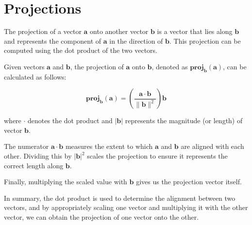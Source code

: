 \chapter{Projections}

The projection of a vector $\mathbf{a}$ onto another vector
$\mathbf{b}$ is a vector that lies along $\mathbf{b}$ and represents
the component of $\mathbf{a}$ in the direction of $\mathbf{b}$. This
projection can be computed using the dot product of the two vectors.

Given vectors $\mathbf{a}$ and $\mathbf{b}$, the projection of
$\mathbf{a}$ onto $\mathbf{b}$, denoted as
$\mathbf{proj}_\mathbf{b}(\mathbf{a})$, can be calculated as follows:

$$\mathbf{proj}_\mathbf{b}(\mathbf{a}) = \left(\frac{{\mathbf{a} \cdot \mathbf{b}}}{{\|\mathbf{b}\|^2}}\right) \mathbf{b}$$

where $\cdot$ denotes the dot product and $|\mathbf{b}|$ represents
the magnitude (or length) of vector $\mathbf{b}$.

The numerator $\mathbf{a} \cdot \mathbf{b}$ measures the extent to
which $\mathbf{a}$ and $\mathbf{b}$ are aligned with each
other. Dividing this by $|\mathbf{b}|^2$ scales the projection to
ensure it represents the correct length along $\mathbf{b}$.

Finally, multiplying the scaled value with $\mathbf{b}$ gives us the
projection vector itself.

In summary, the dot product is used to determine the alignment between
two vectors, and by appropriately scaling one vector and multiplying
it with the other vector, we can obtain the projection of one vector
onto the other.
